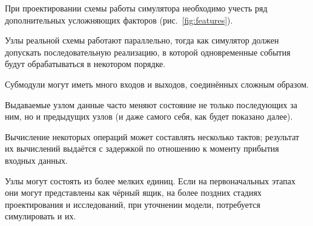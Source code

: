 При проектировании схемы работы симулятора необходимо учесть ряд дополнительных усложняющих факторов (рис.~\ref{fig:features}).

\begin{itemize*}
    \item Узлы реальной схемы работают параллельно, тогда как симулятор должен допускать последовательную реализацию, в которой одновременные события будут обрабатываться в некотором порядке.
    \item Субмодули могут иметь много входов и выходов, соединённых сложным образом.
    \item Выдаваемые узлом данные часто меняют состояние не только последующих за ним, но и предыдущих узлов (и даже самого себя, как будет показано далее).
    \item Вычисление некоторых операций может составлять несколько тактов; результат их вычислений выдаётся с задержкой по отношению к моменту прибытия входных данных.
    \item Узлы могут состоять из более мелких единиц. Если на первоначальных этапах они могут представлены как чёрный ящик, на более поздних стадиях проектирования и исследований, при  уточнении модели, потребуется симулировать и их.
\end{itemize*}

